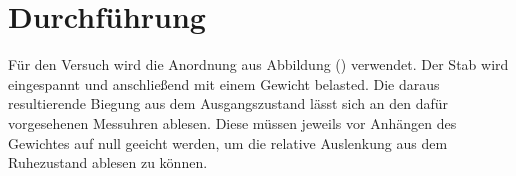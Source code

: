 \section{Durchführung}
Für den Versuch wird die Anordnung aus Abbildung () verwendet. Der Stab wird eingespannt und anschließend mit einem Gewicht belasted. Die daraus 
resultierende Biegung aus dem Ausgangszustand lässt sich an den dafür vorgesehenen Messuhren ablesen. Diese müssen jeweils vor Anhängen des Gewichtes 
auf null geeicht werden, um die relative Auslenkung aus dem Ruhezustand ablesen zu können. \\
